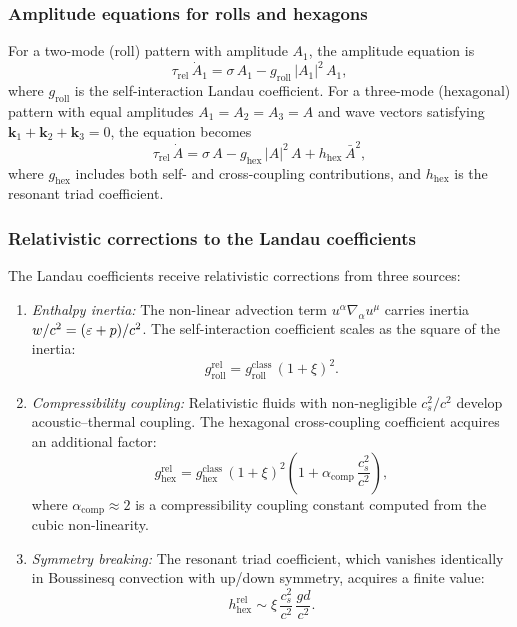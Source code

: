 \subsubsection*{Amplitude equations for rolls and hexagons}

For a two-mode (roll) pattern with amplitude $A_1$, the
amplitude equation is
\begin{equation}
\label{eq:rel-roll-amp}
\tau_{\mathrm{rel}}\,\dot{A}_1
= \sigma\,A_1 - g_{\mathrm{roll}}\,|A_1|^2\,A_1,
\end{equation}
where $g_{\mathrm{roll}}$ is the self-interaction Landau
coefficient.  For a three-mode (hexagonal) pattern with equal
amplitudes $A_1 = A_2 = A_3 = A$ and wave vectors satisfying
$\mathbf{k}_1 + \mathbf{k}_2 + \mathbf{k}_3 = 0$, the
equation becomes
\begin{equation}
\label{eq:rel-hex-amp}
\tau_{\mathrm{rel}}\,\dot{A}
= \sigma\,A - g_{\mathrm{hex}}\,|A|^2\,A
+ h_{\mathrm{hex}}\,\bar{A}^2,
\end{equation}
where $g_{\mathrm{hex}}$ includes both self- and cross-coupling
contributions, and $h_{\mathrm{hex}}$ is the resonant triad
coefficient.

\subsubsection*{Relativistic corrections to the Landau coefficients}

The Landau coefficients receive relativistic corrections from
three sources:
\begin{enumerate}
\item \emph{Enthalpy inertia:}  The non-linear advection term
  $u^\alpha\nabla_\alpha u^\mu$ carries inertia
  $w/c^2 = (\varepsilon+p)/c^2$.  The self-interaction
  coefficient scales as the square of the inertia:
  \begin{equation}
  \label{eq:rel-g-roll}
  g_{\mathrm{roll}}^{\mathrm{rel}}
  = g_{\mathrm{roll}}^{\mathrm{class}}\,(1 + \xi)^2.
  \end{equation}

\item \emph{Compressibility coupling:}  Relativistic fluids with
  non-negligible $c_s^2/c^2$ develop acoustic--thermal coupling.
  The hexagonal cross-coupling coefficient acquires an additional
  factor:
  \begin{equation}
  \label{eq:rel-g-hex}
  g_{\mathrm{hex}}^{\mathrm{rel}}
  = g_{\mathrm{hex}}^{\mathrm{class}}\,(1 + \xi)^2
    \left(1 + \alpha_{\mathrm{comp}}\,\frac{c_s^2}{c^2}\right),
  \end{equation}
  where $\alpha_{\mathrm{comp}} \approx 2$ is a
  compressibility coupling constant computed from the
  cubic non-linearity.

\item \emph{Symmetry breaking:}  The resonant triad coefficient,
  which vanishes identically in Boussinesq convection with
  up/down symmetry, acquires a finite value:
  \begin{equation}
  \label{eq:rel-h-hex}
  h_{\mathrm{hex}}^{\mathrm{rel}}
  \sim \xi\,\frac{c_s^2}{c^2}\,\frac{gd}{c^2}.
  \end{equation}
\end{enumerate}

